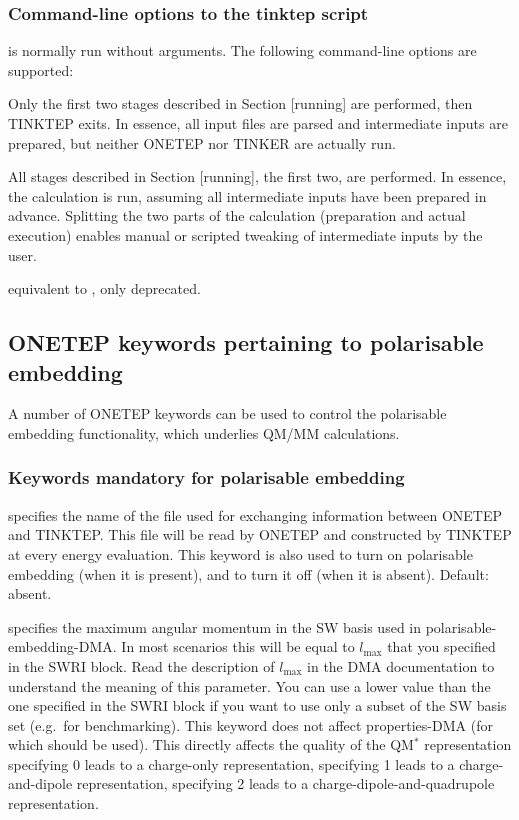 \documentclass[letterpaper,10pt,english]{sphinxmanual}
\begin{document}
\subsubsection{Command-line options to the tinktep script}
\label{\detokenize{tinktep:command-line-options-to-the-tinktep-script}}
 is normally run without arguments. The following
command-line options are supported:

 \textendash{} Only the first two stages described in Section {[}running{]} are
performed, then TINKTEP exits. In essence, all input files are parsed
and intermediate inputs are prepared, but neither ONETEP nor TINKER are
actually run.

 \textendash{} All stages described in Section {[}running{]},  the first
two, are performed. In essence, the calculation is run, assuming all
intermediate inputs have been prepared in advance. Splitting the two
parts of the calculation (preparation and actual execution) enables
manual or scripted tweaking of intermediate inputs by the user.

 \textendash{} equivalent to , only deprecated.


\subsection{ONETEP keywords pertaining to polarisable embedding}
\label{\detokenize{tinktep:onetep-keywords-pertaining-to-polarisable-embedding}}
A number of ONETEP keywords can be used to control the polarisable
embedding functionality, which underlies QM/MM calculations.


\subsubsection{Keywords mandatory for polarisable embedding}
\label{\detokenize{tinktep:keywords-mandatory-for-polarisable-embedding}}
 \textendash{} specifies the name of the file used
for exchanging information between ONETEP and TINKTEP. This file will be
read by ONETEP and constructed by TINKTEP at every energy evaluation.
This keyword is also used to turn on polarisable embedding (when it is
present), and to turn it off (when it is absent). Default: absent.

 \textendash{} specifies the maximum angular momentum
in the SW basis used in polarisable-embedding-DMA. In most scenarios
this will be equal to \(l_{\textrm{max}}\) that you specified in the
SWRI block. Read the description of \(l_{\textrm{max}}\) in the DMA
documentation to understand the meaning of this parameter. You can use a
lower value than the one specified in the SWRI block if you want to use
only a subset of the SW basis set (e.g. for benchmarking). This keyword
does not affect properties-DMA (for which  should be used).
This directly affects the quality of the QM\(^*\) representation \textendash{}
specifying 0 leads to a charge-only representation, specifying 1 leads
to a charge-and-dipole representation, specifying 2 leads to a
charge-dipole-and-quadrupole representation.
\end{document}
